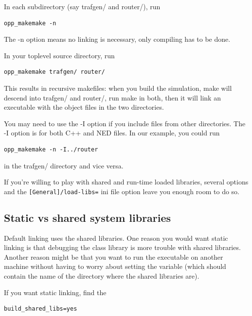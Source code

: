 In each subdirectory (say trafgen/ and router/), run

\begin{Verbatim}
opp_makemake -n
\end{Verbatim}

The -n option means no linking is necessary, only compiling has 
to be done.


In your toplevel source directory, run

\begin{Verbatim}
opp_makemake trafgen/ router/
\end{Verbatim}

This results in recursive makefiles: when you build the simulation, make 
will descend into trafgen/ and router/, run make in both, then 
it will link an executable with the object files in the two directories.


You may need to use the -I option if you include files from other
directories. The -I option is for both C++ and NED
files. In our example, you could run

\begin{Verbatim}
opp_makemake -n -I../router
\end{Verbatim}

in the trafgen/ directory and vice versa.


If you're willing to play with shared and run-time loaded libraries,
several  options and the
\texttt{[General]/load-libs=} ini file option leave you enough room to
do so.





\subsection{Static vs shared {\opp} system libraries}

Default linking uses the shared libraries. One
reason you would want static linking is that
debugging the {\opp} class library is more trouble
with shared libraries. Another reason might be that you want to run
the executable on another machine without having to worry about
setting the  variable (which should contain the name
of the directory where the {\opp} shared libraries are).

If you want static linking, find the

\begin{Verbatim}
build_shared_libs=yes
\end{Verbatim}


